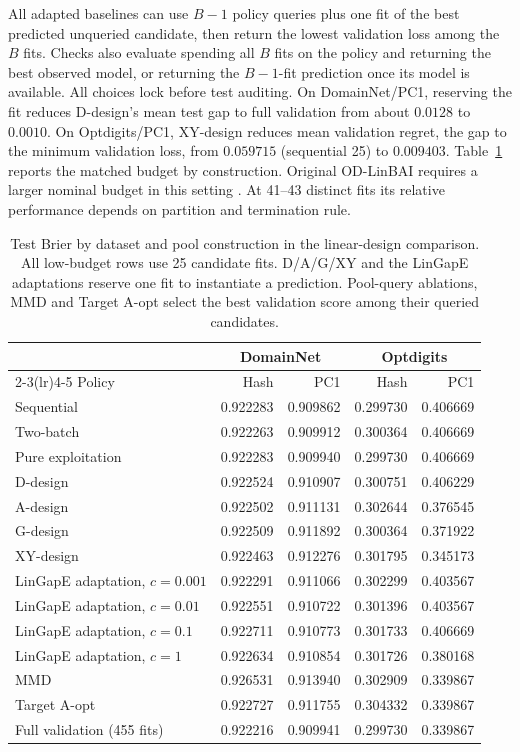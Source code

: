 All adapted baselines can use $B-1$ policy queries plus one fit of the best predicted unqueried candidate, then return the lowest validation loss among the $B$ fits. Checks also evaluate spending all $B$ fits on the policy and returning the best observed model, or returning the $B-1$-fit prediction once its model is available. All choices lock before test auditing. On DomainNet/PC1, reserving the fit reduces D-design's mean test gap to full validation from about $0.0128$ to $0.0010$. On Optdigits/PC1, XY-design reduces mean validation regret, the gap to the minimum validation loss, from $0.059715$ (sequential 25) to $0.009403$. Table~\ref{tab:fresh-linear-breakdown} reports the matched budget by construction. Original OD-LinBAI requires a larger nominal budget in this setting \citep{yangtan2022linbai}. At 41--43 distinct fits its relative performance depends on partition and termination rule.

\begin{table}[!htb]
\centering
\caption{Test Brier by dataset and pool construction in the linear-design comparison. All low-budget rows use 25 candidate fits. D/A/G/XY and the LinGapE adaptations reserve one fit to instantiate a prediction. Pool-query ablations, MMD and Target A-opt select the best validation score among their queried candidates.}
\label{tab:fresh-linear-breakdown}
\begin{tabular}{lrrrr}
\toprule
 & \multicolumn{2}{c}{DomainNet} & \multicolumn{2}{c}{Optdigits} \\
\cmidrule(lr){2-3}\cmidrule(lr){4-5}
Policy & Hash & PC1 & Hash & PC1 \\
\midrule
Sequential & 0.922283 & 0.909862 & 0.299730 & 0.406669 \\
Two-batch & 0.922263 & 0.909912 & 0.300364 & 0.406669 \\
Pure exploitation & 0.922283 & 0.909940 & 0.299730 & 0.406669 \\
D-design & 0.922524 & 0.910907 & 0.300751 & 0.406229 \\
A-design & 0.922502 & 0.911131 & 0.302644 & 0.376545 \\
G-design & 0.922509 & 0.911892 & 0.300364 & 0.371922 \\
XY-design & 0.922463 & 0.912276 & 0.301795 & 0.345173 \\
LinGapE adaptation, $c=0.001$ & 0.922291 & 0.911066 & 0.302299 & 0.403567 \\
LinGapE adaptation, $c=0.01$ & 0.922551 & 0.910722 & 0.301396 & 0.403567 \\
LinGapE adaptation, $c=0.1$ & 0.922711 & 0.910773 & 0.301733 & 0.406669 \\
LinGapE adaptation, $c=1$ & 0.922634 & 0.910854 & 0.301726 & 0.380168 \\
MMD & 0.926531 & 0.913940 & 0.302909 & 0.339867 \\
Target A-opt & 0.922727 & 0.911755 & 0.304332 & 0.339867 \\
Full validation (455 fits) & 0.922216 & 0.909941 & 0.299730 & 0.339867 \\
\bottomrule
\end{tabular}
\end{table}


